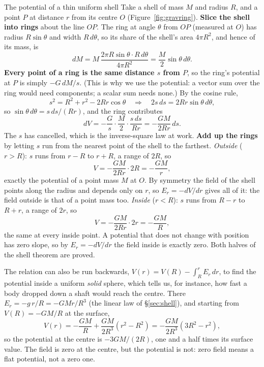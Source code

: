 \begin{derivbox}{The potential of a thin uniform shell}
Take a shell of mass $M$ and radius $R$, and a point $P$ at distance $r$ from its centre $O$
(Figure~\ref{fig:gravring}).
 \textbf{Slice the shell into rings} about the line $OP$. The ring at angle $\theta$ from $OP$
(measured at $O$) has radius $R\sin\theta$ and width $R\,d\theta$, so its share of the shell's area
$4\pi R^2$, and hence of its mass, is
\[
dM=M\,\frac{2\pi R\sin\theta\cdot R\,d\theta}{4\pi R^2}=\frac{M}{2}\sin\theta\,d\theta .
\]
 \textbf{Every point of a ring is the same distance $s$ from $P$}, so the ring's potential at $P$
is simply $-G\,dM/s$. (This is why we use the potential: a vector sum over the ring would need
components; a scalar sum needs none.) By the cosine rule,
\[
s^2=R^2+r^2-2Rr\cos\theta\quad\Longrightarrow\quad 2s\,ds=2Rr\sin\theta\,d\theta ,
\]
so $\sin\theta\,d\theta=s\,ds/(Rr)$, and the ring contributes
\[
dV=-\frac{G}{s}\cdot\frac{M}{2}\cdot\frac{s\,ds}{Rr}=-\frac{GM}{2Rr}\,ds .
\]
The $s$ has cancelled, which is the inverse-square law at work.
 \textbf{Add up the rings} by letting $s$ run from the nearest point of the shell to the farthest.
\emph{Outside} ($r>R$): $s$ runs from $r-R$ to $r+R$, a range of $2R$, so
\[
V=-\frac{GM}{2Rr}\cdot2R=-\frac{GM}{r},
\]
exactly the potential of a point mass $M$ at $O$. By symmetry the field of the shell points along the
radius and depends only on $r$, so $E_r=-dV/dr$ gives all of it: the field outside is that of a point
mass too.
\emph{Inside} ($r<R$): $s$ runs from $R-r$ to $R+r$, a range of $2r$, so
\[
V=-\frac{GM}{2Rr}\cdot2r=-\frac{GM}{R},
\]
the same at every inside point. A potential that does not change with position has zero slope, so by
$E_r=-dV/dr$ the field inside is exactly zero. Both halves of the shell theorem are proved.
\end{derivbox}

The relation can also be run backwards, $V(r)=V(R)-\int_R^r E_r\,dr$, to find the potential inside a
uniform \emph{solid} sphere, which tells us, for instance, how fast a body dropped down a shaft would reach
the centre. There $E_r=-g\,r/R=-GMr/R^3$ (the linear law of \S\ref{sec:shell}), and
starting from $V(R)=-GM/R$ at the surface,
\[
V(r)=-\frac{GM}{R}+\frac{GM}{2R^3}\left(r^2-R^2\right)=-\frac{GM}{2R^3}\left(3R^2-r^2\right),
\]
so the potential at the centre is $-3GM/(2R)$, one and a half times its surface value. The field is zero
at the centre, but the potential is not: zero field means a flat potential, not a zero one.

